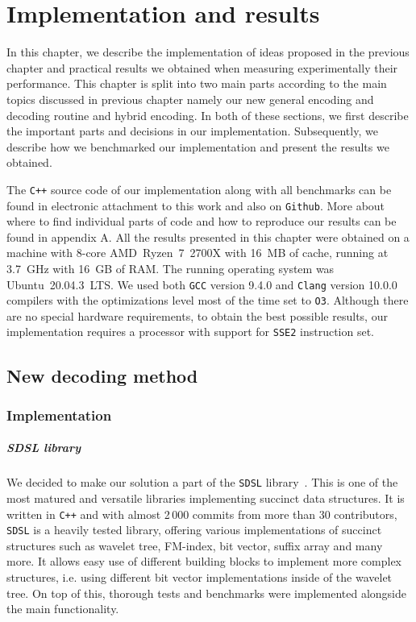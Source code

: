 \chapter{Implementation and results}
\label{kap:kap4}

In this chapter, we describe the implementation of ideas proposed in the previous
chapter and practical results we obtained when measuring experimentally their performance.
This chapter is split into two main parts according to the main topics discussed
in previous chapter namely our new general encoding and decoding routine and hybrid encoding.
In both of these sections, we first describe the important parts and decisions in our
implementation. Subsequently, we describe how we benchmarked our implementation and present
the results we obtained.

The \texttt{C++} source code of our implementation along with all benchmarks can be found
in electronic attachment to this work and also on \texttt{Github}. More about where to
find individual parts of code and how to reproduce our results can be found in appendix A.
All the results presented in this chapter were obtained on a machine with 8-core
AMD~Ryzen~7~2700X with 16~MB of cache, running at 3.7~GHz with 16~GB of RAM. The running
operating system was Ubuntu~20.04.3~LTS. We used both \texttt{GCC} version 9.4.0 and
\texttt{Clang} version 10.0.0 compilers with the optimizations level most of the time
set to \texttt{O3}. Although there are no special hardware requirements, to obtain the
best possible results, our implementation requires a processor with support for \texttt{SSE2}
instruction set.

\section{New decoding method}

\subsection{Implementation}

\paragraph{SDSL library}

We decided to make our solution a part of the \texttt{SDSL} library~\citep{gog2014theory}. This
is one of the most matured and versatile libraries implementing succinct data structures. It is
written in \texttt{C++} and with almost 2\,000 commits from more than 30 contributors, \texttt{SDSL}
is a heavily tested library, offering various implementations of succinct structures such as
wavelet tree, FM-index, bit vector, suffix array and many more. It allows easy use of different
building blocks to implement more complex structures, i.e. using different bit vector implementations
inside of the wavelet tree. On top of this, thorough tests and benchmarks were implemented alongside
the main functionality.

